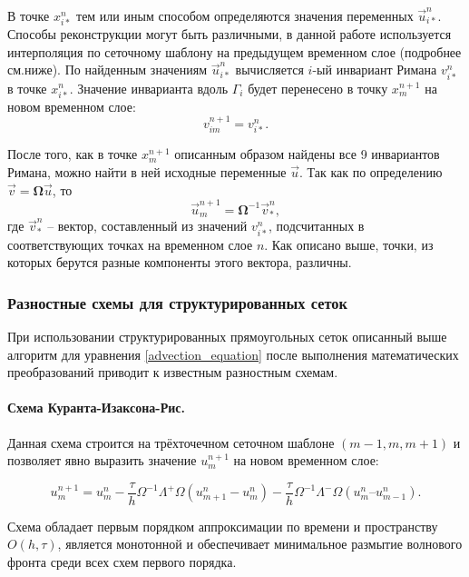 В точке $x_{i*}^n$ тем или иным способом определяются значения переменных $\vec u_{i*}^n$. Способы реконструкции могут быть различными, в данной работе используется интерполяция по сеточному шаблону на предыдущем временном слое (подробнее см.ниже). По найденным значениям $\vec u_{i*}^n$ вычисляется $i$-ый инвариант Римана $v_{i*}^n$ в точке $x_{i*}^n$. Значение инварианта вдоль $\Gamma_i$ будет перенесено в точку $x_m^{n+1}$ на новом временном слое:
\begin{equation}
v_{im}^{n+1} = v_{i*}^n.
\end{equation}

После того, как в точке $x_m^{n+1}$ описанным образом найдены все 9 инвариантов Римана, можно найти в ней исходные переменные $\vec u$. Так как по определению ${\vec v}=\mathbf\Omega{\vec u}$, то
\begin{equation}
{\vec u}_m^{n+1}=\mathbf\Omega^{-1}{\vec v}_*^n,
\end{equation}
где ${\vec v}_*^n$ -- вектор, составленный из значений $v_{i*}^n$, подсчитанных в соответствующих точках на временном слое $n$. Как описано выше, точки, из которых берутся разные компоненты этого вектора, различны.


\subsubsection{Разностные схемы для структурированных сеток}

При использовании структурированных прямоугольных сеток описанный выше алгоритм для уравнения \eqref{advection_equation} после выполнения математических преобразований приводит к известным разностным схемам.

\paragraph{Схема Куранта-Изаксона-Рис.} Данная схема строится на трёхточечном сеточном шаблоне $(m-1, m, m+1)$ и позволяет явно выразить значение $u_m^{n+1}$ на новом временном слое:

\begin{equation}
	\label{CIR scheme}
	u^{n+1}_m = u^n_m - \frac{\tau}{h} \Omega^{-1} \Lambda^+ \Omega (u^n_{m+1} - u^n_m) 
	- \frac{\tau}{h} \Omega^{-1} \Lambda^- \Omega (u^n_m – u^n_{m-1}) .
\end{equation}

Схема обладает первым порядком аппроксимации по времени и пространству $O(h, \tau)$, является монотонной и обеспечивает минимальное размытие волнового фронта среди всех схем первого порядка.

